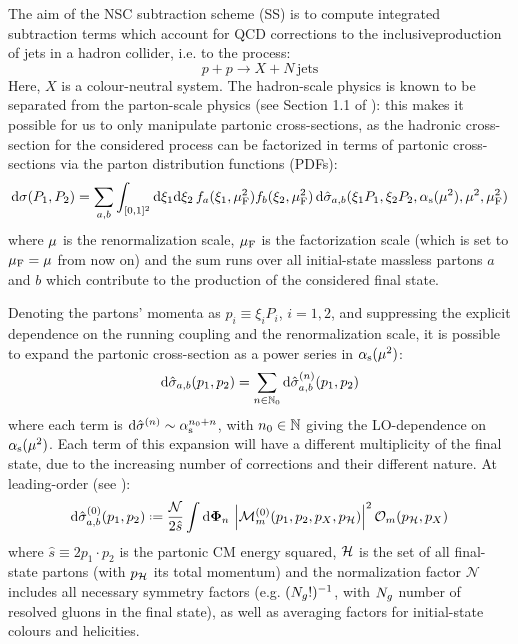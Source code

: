 
The aim of the NSC subtraction scheme (SS) is to compute integrated subtraction terms which account for QCD corrections to the inclusive\footnotemark production of jets in a hadron collider, i.e. to the process:
\begin{equation}
  p + p \rightarrow X + N \,\text{jets}
\end{equation}
Here, $ X $ is a colour-neutral system. The hadron-scale physics is known to be separated from the parton-scale physics (see Section 1.1 of \cite{Collins-2011}): this makes it possible for us to only manipulate partonic cross-sections, as the hadronic cross-section for the considered process can be factorized in terms of partonic cross-sections via the parton distribution functions (PDFs):
\begin{equation}
  \mathrm{d}\sigma(P_1 , P_2) = \sum_{a,b} \int_{[0,1]^2} \mathrm{d} \xi_1 \mathrm{d} \xi_2 \, f_a(\xi_1, \mu_\text{F}^2) f_b(\xi_2, \mu_\text{F}^2) \, \mathrm{d}\hat{\sigma}_{a,b}(\xi_1 P_1, \xi_2 P_2, \alpha_\text{s}(\mu^2), \mu^2, \mu_\text{F}^2)
\end{equation}
where $ \mu $ is the renormalization scale, $ \mu_\text{F} $ is the factorization scale (which is set to $ \mu_\text{F} = \mu $ from now on) and the sum runs over all initial-state massless partons $ a $ and $ b $ which contribute to the production of the considered final state.


Denoting the partons' momenta as $ p_i \equiv \xi_i P_i $, $ i = 1,2 $, and suppressing the explicit dependence on the running coupling and the renormalization scale, it is possible to expand the partonic cross-section as a power series in $ \alpha_\text{s}(\mu^2) $:
\begin{equation}
  \mathrm{d}\hat{\sigma}_{a,b}(p_1 , p_2) = \sum_{n \in \mathbb{N}_0} \mathrm{d}\hat{\sigma}_{a,b}^{(n)}(p_1 , p_2)
\end{equation}
where each term is $ \mathrm{d}\hat{\sigma}^{(n)} \sim \alpha_\text{s}^{n_0 + n} $, with $ n_0 \in \mathbb{N} $ giving the LO-dependence on $ \alpha_\text{s}(\mu^2) $. Each term of this expansion will have a different multiplicity of the final state, due to the increasing number of corrections and their different nature. At leading-order (see ):
\begin{equation}
  \dd\pcs_{a,b}^{(0)}(p_1 , p_2) \defeq \frac{\mathcal{N}}{2\hat{s}} \int \lps_n \, \abs{\mat^{(0)}_m(p_1, p_2, p_X, p_\fs)}^2 \mathcal{O}_m(p_\fs, p_X)
\end{equation}
where $ \hat{s} \equiv 2 p_1 \cdot p_2 $ is the partonic CM energy squared, $ \mathcal{H} $ is the set of all final-state partons (with $ p_{\mathcal{H}} $ its total momentum) and the normalization factor $ \mathcal{N} $ includes all necessary symmetry factors (e.g. $ (N_g!)^{-1} $, with $ N_g $ number of resolved gluons in the final state), as well as averaging factors for initial-state colours and helicities.

